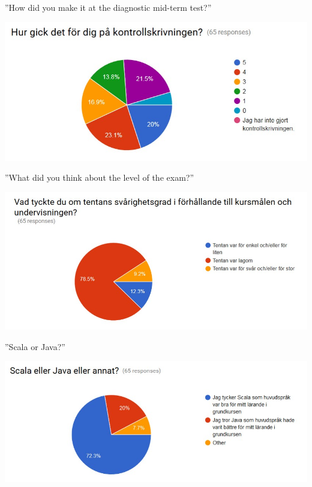 \documentclass{lecturenotes}
\begin{document}
\begin{Slide}{''How did you make it at the diagnostic mid-term test?''}
\begin{center}
\includegraphics[width=\textwidth]{img/Q-kontroll}
\end{center}
\end{Slide}

\begin{Slide}{''What did you think about the level of the exam?''}
\begin{center}
\includegraphics[width=\textwidth]{img/Q-exam-hard}
\end{center}
\end{Slide}

\begin{Slide}{''Scala or Java?''}
\begin{center}
\includegraphics[width=\textwidth]{img/Q-scala}
\end{center}
\end{Slide}
\end{document}
